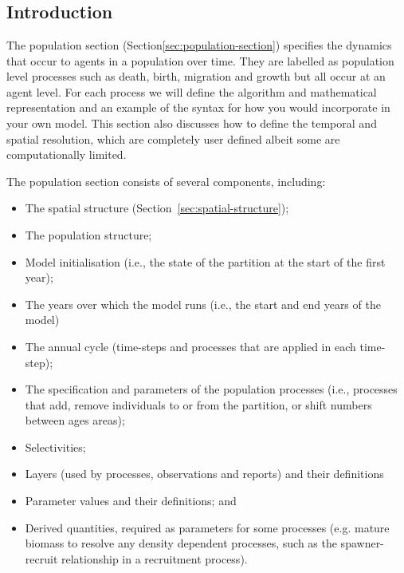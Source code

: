 \section{\label{sec:population-section}}

\subsection{Introduction}
The population section (Section\ref{sec:population-section}) specifies the dynamics that occur to agents in a population over time. They are labelled as population level processes such as death, birth, migration and growth but all occur at an agent level. For each process we will define the algorithm and mathematical representation and an example of the syntax for how you would incorporate in your own model. This section also discusses how to define the temporal and spatial resolution, which are completely user defined albeit some are computationally limited.

The population section consists of several components, including:
\begin{itemize}
  \item The spatial structure (Section~\ref{sec:spatial-structure});
  \item The population structure;
  \item Model initialisation (i.e., the state of the partition at the start of the first year);
  \item The years over which the model runs (i.e., the start and end years of the model)
  \item The annual cycle (time-steps and processes that are applied in each time-step);
  \item The specification and parameters of the population processes (i.e., processes that add, remove individuals to or from the partition, or shift numbers between ages areas);
  \item Selectivities;
  \item Layers (used by processes, observations and reports) and their definitions
  \item Parameter values and their definitions; and
  \item Derived quantities, required as parameters for some processes (e.g. mature biomass to resolve any density dependent processes, such as the spawner-recruit relationship in a recruitment process).
\end{itemize}

